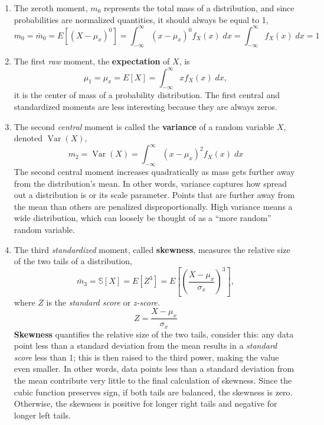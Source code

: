 \documentclass{tufte-handout}
\DeclareMathOperator{\var}{Var}
\begin{document}
\begin{definition}$  $\newline 
  \begin{enumerate}
    \item The zeroth moment, $m_0$ represents the total mass of a distribution, and since probabilities are normalized quantities, it should always be equal to 1, 
    $$m_0 =\bar m_0 = E[(X-\mu_x)^0] = \int_{-\infty}^\infty (x-\mu_x)^0 f_X(x)\; dx = \int_{-\infty}^\infty f_X(x)\; dx = 1    $$
    \item The first \textit{raw} moment, the \textbf{expectation} of $X$, is
    $$\mu_1 = \mu_x = E[X] = \int_{-\infty}^\infty x f_X(x)\; dx  ,$$
    it is the center of mass of a probability distribution. The first central and standardized moments are less interesting because they are always zeros. 
    \item The second \textit{central} moment is called the \textbf{variance} of a random variable $X$, denoted $\var (X),$
    $$m_2 = \var (X) = \int_{-\infty}^\infty (x - \mu_x)^2 f_X(x) \; dx $$
The second central moment increases quadratically as mass gets further away from the distribution’s mean. In other words, variance captures how spread out a distribution is or its scale parameter. Points that are further away from the mean than others are penalized disproportionally. High variance means a wide distribution, which can loosely be thought of as a “more random” random variable. 
    \item The third \textit{standardized} moment, called \textbf{skewness}, measures the relative size of the two tails of a distribution,
    $$\bar m_3 = \mathbb{S}[X] = E[Z^3] = E \left[ \left( \frac{X-\mu_x}{\sigma_x}  \right)^3 \right], $$
    where $Z$ is the \textit{standard score} or \textit{z-score.}
    $$Z = \frac{X-\mu_x}{\sigma_x} $$
    \textbf{Skewness} quantifies the relative size of the two tails, consider this: any data point less than a standard deviation from the mean results in a \textit{standard score} less than 1; this is then raised to the third power, making the value even smaller. In other words, data points less than a standard deviation from the mean contribute very little to the final calculation of skewness. Since the cubic function preserves sign, if both tails are balanced, the skewness is zero. Otherwise, the skewness is positive for longer right tails and negative for longer left tails.


\end{enumerate}
\end{definition}
\end{document}
